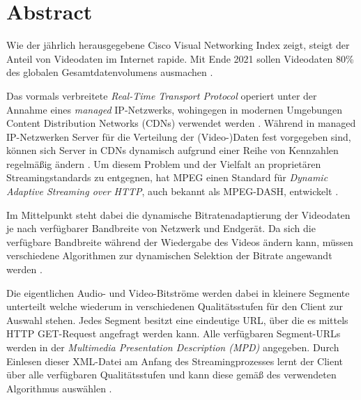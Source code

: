 \documentclass[paper = a4, fontsize = 12pt, parskip = half]{scrartcl} %
\begin{document}





\setcounter{page}{1}
\onehalfspacing

\section*{Abstract}
Wie der jährlich herausgegebene Cisco Visual Networking Index \cite{cisco_syst_inc_cisco_2017} zeigt, steigt der Anteil von Videodaten im Internet rapide. Mit Ende 2021 sollen Videodaten 80\% des globalen Gesamtdatenvolumens ausmachen \cite{cisco_syst_inc_cisco_2017}.

Das vormals verbreitete \textit{Real-Time Transport Protocol} operiert unter der Annahme eines \textit{managed} IP-Netzwerks, wohingegen in modernen Umgebungen Content Distribution Networks (CDNs) verwendet werden \cite{sodagar_mpeg-dash_2011}. Während in managed IP-Netzwerken Server für die Verteilung der (Video-)Daten fest vorgegeben sind, können sich Server in CDNs dynamisch aufgrund einer Reihe von Kennzahlen regelmäßig ändern \cite{buyya_content_2008}. Um diesem Problem und der Vielfalt an proprietären Streamingstandards zu entgegnen, hat MPEG einen Standard für \textit{Dynamic Adaptive Streaming over HTTP}, auch bekannt als MPEG-DASH, entwickelt \cite{sodagar_mpeg-dash_2011}.

Im Mittelpunkt steht dabei die dynamische Bitratenadaptierung der Videodaten je nach verfügbarer Bandbreite von Netzwerk und Endgerät. Da sich die verfügbare Bandbreite während der Wiedergabe des Videos ändern kann, müssen verschiedene Algorithmen zur dynamischen Selektion der Bitrate angewandt werden \cite{bentaleb_survey_2019}.

Die eigentlichen Audio- und Video-Bitströme werden dabei in kleinere Segmente unterteilt welche wiederum in verschiedenen Qualitätsstufen für den Client zur Auswahl stehen. Jedes Segment besitzt eine eindeutige URL, über die es mittels HTTP GET-Request angefragt werden kann. Alle verfügbaren Segment-URLs werden in der \textit{Multimedia Presentation Description (MPD)} angegeben. Durch Einlesen dieser XML-Datei am Anfang des Streamingprozesses lernt der Client über alle verfügbaren Qualitätsstufen und kann diese gemäß des verwendeten Algorithmus auswählen \cite{sodagar_mpeg-dash_2011}.
\end{document}
